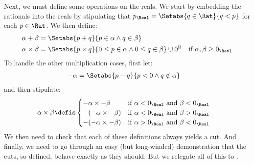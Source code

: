 \documentclass[../../../include/open-logic-section]{subfiles}
\begin{document}
Next, we must define some operations on the reals. We start by
embedding the rationals into the reals by stipulating that $p_\Real =
\Setabs{q \in \Rat}{q < p}$ for each $p \in \Rat$. We then define:
\begin{align*}
	\alpha + \beta &= \Setabs{p + q}{p \in \alpha \land q \in \beta}\\
	\alpha \times \beta &= 
	\Setabs{p \times q}{0 \leq p \in \alpha \land 0 \leq q \in \beta} \cup 0^\mathbb{R} & \text{if }\alpha, \beta \geq 0_\Real
\end{align*}
To handle the other multiplication cases, first let: %
\begin{align*}
	-\alpha &= \Setabs{p - q}{p < 0 \land q \notin \alpha}
\end{align*}
and then stipulate:
\begin{align*}
	\alpha \times \beta &\defis 
	\begin{cases}
		\mathord{-}\alpha \times \mathord{-}\beta &\text{if }\alpha < 0_\Real\text{ and }\beta < 0_\Real\\
		\mathord{-}(\mathord{-}\alpha \times \mathord{-}\beta) &\text{if }\alpha < 0_\Real \text{ and }\beta > 0_\Real\\
		\mathord{-}(\mathord{-}\alpha \times \mathord{-}\beta) &\text{if }\alpha > 0_\Real \text{ and }\beta < 0_\Real
	\end{cases}
\end{align*}
We then need to check that each of these definitions always yields a
cut. And finally, we need to go through an easy (but long-winded)
demonstration that the cuts, so defined, behave exactly as they
should. But we relegate all of this to .
\end{document}
